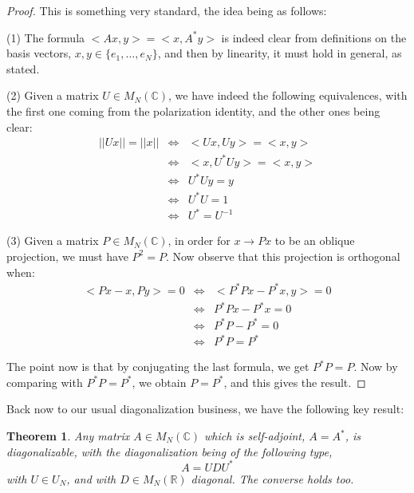 \documentclass[12pt]{amsbook}
\newtheorem{theorem}{Theorem}[chapter]
\begin{document}
\begin{proof}
This is something very standard, the idea being as follows:

\medskip

(1) The formula $<Ax,y>=<x,A^*y>$ is indeed clear from definitions on the basis vectors, $x,y\in\{e_1,\ldots,e_N\}$, and then by linearity, it must hold in general, as stated.

\medskip

(2) Given a matrix $U\in M_N(\mathbb C)$, we have indeed the following equivalences, with the first one coming from the polarization identity, and the other ones being clear:
\begin{eqnarray*}
||Ux||=||x||
&\iff&<Ux,Uy>=<x,y>\\
&\iff&<x,U^*Uy>=<x,y>\\
&\iff&U^*Uy=y\\
&\iff&U^*U=1\\
&\iff&U^*=U^{-1}
\end{eqnarray*}

(3) Given a matrix $P\in M_N(\mathbb C)$, in order for $x\to Px$ to be an oblique projection, we must have $P^2=P$. Now observe that this projection is orthogonal when:
\begin{eqnarray*}
<Px-x,Py>=0
&\iff&<P^*Px-P^*x,y>=0\\
&\iff&P^*Px-P^*x=0\\
&\iff&P^*P-P^*=0\\
&\iff&P^*P=P^*
\end{eqnarray*}

The point now is that by conjugating the last formula, we get $P^*P=P$. Now by comparing with $P^*P=P^*$, we obtain $P=P^*$, and this gives the result. 
\end{proof}

Back now to our usual diagonalization business, we have the following key result:

\begin{theorem}
Any matrix $A\in M_N(\mathbb C)$ which is self-adjoint, $A=A^*$, is diagonalizable, with the diagonalization being of the following type,
$$A=UDU^*$$
with $U\in U_N$, and with $D\in M_N(\mathbb R)$ diagonal. The converse holds too.
\end{theorem}
\end{document}
